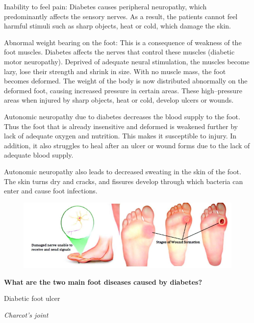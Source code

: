 {\item Inability to feel pain: Diabetes causes peripheral neuropathy, which predominantly affects the sensory nerves. As a result, the patients cannot feel harmful stimuli such as sharp objects, heat or cold, which damage the skin.

 \item Abnormal weight bearing on the foot: This is a consequence of weakness of the foot muscles. Diabetes affects the nerves that control these muscles (diabetic motor neuropathy). Deprived of adequate neural stimulation, the muscles become lazy, lose their strength and shrink in size. With no muscle mass, the foot becomes deformed. The weight of the body is now distributed abnormally on the deformed foot, causing increased pressure in certain areas. These high–pressure areas when injured by sharp objects, heat or cold, develop ulcers or wounds.

 \item Autonomic neuropathy due to diabetes decreases the blood supply to the foot. Thus the foot that is already insensitive and deformed is weakened further by lack of adequate oxygen and nutrition. This makes it susceptible to injury. In addition, it also struggles to heal after an ulcer or wound forms due to the lack of adequate blood supply.

 \item Autonomic neuropathy also leads to decreased sweating in the skin of the foot. The skin turns dry and cracks, and fissures develop through which bacteria can enter and cause foot infections.


\begin{figure}
\includegraphics{images/057.jpg}
\end{figure}

\textbf{What are the two main foot diseases caused by diabetes?}

\item Diabetic foot ulcer

 \item \textit{Charcot’s joint}

}
